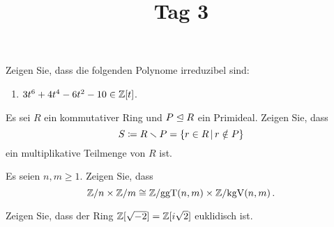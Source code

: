 \documentclass[a4paper, 10pt]{scrartcl}
\title{Tag 3}
\author{}
\date{}
\begin{document}
\begin{question}
  Zeigen Sie, dass die folgenden Polynome irreduzibel sind:
  \begin{enumerate}
    \item
      $3t^6 + 4t^4 - 6t^2 - 10 \in \mathbb{Z}[t]$.
  \end{enumerate}
\end{question}

\begin{question}
  Es sei $R$ ein kommutativer Ring und $P \mathrel{\trianglelefteq} R$ ein Primideal.
  Zeigen Sie, dass
  \[
              S
    \defined  R \smallsetminus P
    =         \{ r \in R \suchthat r \notin P \}
  \]
  ein multiplikative Teilmenge von $R$ ist.
\end{question}

\begin{question}
  Es seien $n, m \geq 1$.
  Zeigen Sie, dass
  \[
          \mathbb{Z}/n \times \mathbb{Z}/m
    \cong \mathbb{Z}/{\operatorname{ggT}(n,m)} \times \mathbb{Z}/{\operatorname{kgV}(n,m)} \,.
  \]
\end{question}

\begin{question}
  Zeigen Sie, dass der Ring $\mathbb{Z}[\sqrt{-2}] = \mathbb{Z}[i\sqrt{2}]$ euklidisch ist.
\end{question}
\end{document}
